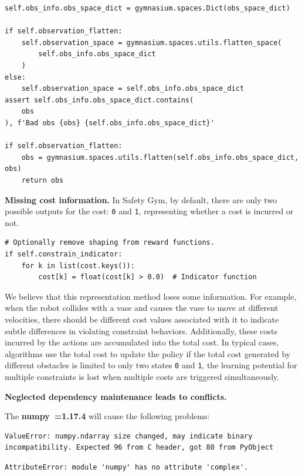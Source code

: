 \documentclass{article}
\begin{document}
\begin{lstlisting}
self.obs_info.obs_space_dict = gymnasium.spaces.Dict(obs_space_dict)

if self.observation_flatten:
    self.observation_space = gymnasium.spaces.utils.flatten_space(
        self.obs_info.obs_space_dict
    )
else:
    self.observation_space = self.obs_info.obs_space_dict
assert self.obs_info.obs_space_dict.contains(
    obs
), f'Bad obs {obs} {self.obs_info.obs_space_dict}'

if self.observation_flatten:
    obs = gymnasium.spaces.utils.flatten(self.obs_info.obs_space_dict, obs)
    return obs
\end{lstlisting}

\textbf{Missing cost information.} In Safety Gym, by default, there are only two possible outputs for the cost: \texttt{0} and \texttt{1}, representing whether a cost is incurred or not.

\begin{lstlisting}
# Optionally remove shaping from reward functions.
if self.constrain_indicator:
    for k in list(cost.keys()):
        cost[k] = float(cost[k] > 0.0)  # Indicator function
\end{lstlisting}

We believe that this representation method loses some information. For example, when the robot collides with a vase and causes the vase to move at different velocities, there should be different cost values associated with it to indicate subtle differences in violating constraint behaviors. Additionally, these costs incurred by the actions are accumulated into the total cost. In typical cases, algorithms use the total cost to update the policy if the total cost generated by different obstacles is limited to only two states \texttt{0} and \texttt{1}, the learning potential for multiple constraints is lost when multiple costs are triggered simultaneously.

\textbf{Neglected dependency maintenance leads to conflicts.}

The \textbf{numpy~=1.17.4} will cause the following problems:

\begin{lstlisting}
ValueError: numpy.ndarray size changed, may indicate binary incompatibility. Expected 96 from C header, got 80 from PyObject
\end{lstlisting}
\begin{lstlisting}
AttributeError: module 'numpy' has no attribute 'complex'.
\end{lstlisting}
\newpage
\end{document}

